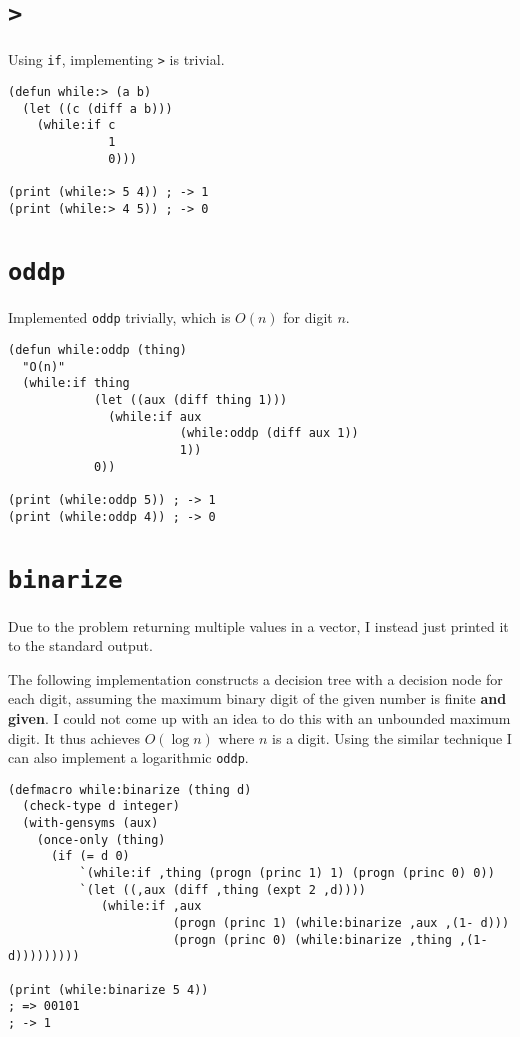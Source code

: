 \documentclass{article}
\begin{document}
\section{\texttt{>}}
\label{sec:org209c9e2}

Using \texttt{if}, implementing \texttt{>} is trivial.

\begin{verbatim}
(defun while:> (a b)
  (let ((c (diff a b)))
    (while:if c
              1
              0)))

(print (while:> 5 4)) ; -> 1
(print (while:> 4 5)) ; -> 0
\end{verbatim}

\section{\texttt{oddp}}
\label{sec:org88529c7}

Implemented \texttt{oddp} trivially, which is $O(n)$ for digit $n$.

\begin{verbatim}
(defun while:oddp (thing)
  "O(n)"
  (while:if thing
            (let ((aux (diff thing 1)))
              (while:if aux
                        (while:oddp (diff aux 1))
                        1))
            0))

(print (while:oddp 5)) ; -> 1
(print (while:oddp 4)) ; -> 0
\end{verbatim}

\section{\texttt{binarize}}
\label{sec:orgbd31612}

Due to the problem returning multiple values in a vector, I instead just printed it to the standard output.

The following implementation constructs a decision tree with a decision
node for each digit, assuming the maximum binary digit of the given
number is finite \textbf{and given}. I could not come up with an idea to
do this with an unbounded maximum digit.  It thus achieves $O(\log n)$
where $n$ is a digit. Using the similar technique I can also implement a
logarithmic \texttt{oddp}.

\begin{verbatim}
(defmacro while:binarize (thing d)
  (check-type d integer)
  (with-gensyms (aux)
    (once-only (thing)
      (if (= d 0)
          `(while:if ,thing (progn (princ 1) 1) (progn (princ 0) 0))
          `(let ((,aux (diff ,thing (expt 2 ,d))))
             (while:if ,aux
                       (progn (princ 1) (while:binarize ,aux ,(1- d)))
                       (progn (princ 0) (while:binarize ,thing ,(1- d)))))))))

(print (while:binarize 5 4))
; => 00101
; -> 1
\end{verbatim}
\end{document}
